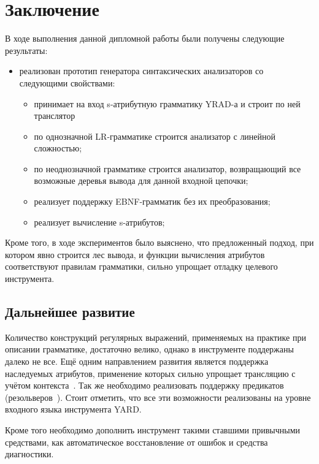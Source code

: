 \section{Заключение}

В ходе выполнения данной дипломной работы были получены следующие результаты:
\begin{itemize}
	
	
	\item реализован прототип генератора синтаксических анализаторов со следующими свойствами:
		\begin{itemize}
		  \item принимает на вход s-атрибутную грамматику YRAD-а и строит по ней транслятор
		  
			\item по однозначной LR-грамматике строится анализатор с линейной сложностью;
			
			\item по неоднозначной грамматике строится анализатор, возвращающий все возможные деревья вывода для данной входной цепочки;
			
			\item реализует поддержку EBNF-грамматик без их преобразования;
			
			\item реализует вычисление s-атрибутов; 
		
		\end{itemize}
		
\end{itemize}

Кроме того, в ходе экспериментов было выяснено, что предложенный подход, при котором явно строится лес вывода, и функции вычисления атрибутов соответствуют правилам грамматики, сильно упрощает отладку целевого инструмента.

\subsection{Дальнейшее развитие}

   Количество конструкций регулярных выражений, применяемых на практике при описании грамматике, достаточно велико, однако в инструменте поддержаны далеко не все. Ещё одним направлением развития является поддержка наследуемых атрибутов, применение которых сильно упрощает трансляцию с учётом контекста~\cite{Diploma}. Так же необходимо реализовать поддержку предикатов (резольверов~\cite{Martinenko}). Стоит отметить, что все эти возможности реализованы на уровне входного языка инструмента YARD.

Кроме того необходимо дополнить инструмент такими ставшими привычными средствами, как автоматическое восстановление от ошибок и средства диагностики.
